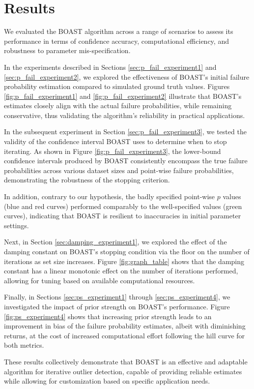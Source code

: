 \section{Results}

We evaluated the BOAST algorithm across a range of scenarios to assess its performance in terms of confidence accuracy, computational efficiency, and robustness to parameter mis-specification.

In the experiments described in Sections \ref{sec:p_fail_experiment1} and \ref{sec:p_fail_experiment2}, we explored the effectiveness of BOAST's initial failure probability estimation compared to simulated ground truth values. Figures \ref{fig:p_fail_experiment1} and \ref{fig:p_fail_experiment2} illustrate that BOAST's estimates closely align with the actual failure probabilities, while remaining conservative, thus validating the algorithm's reliability in practical applications.

In the subsequent experiment in Section \ref{sec:p_fail_experiment3}, we tested the validity of the confidence interval BOAST uses to determine when to stop iterating. As shown in Figure \ref{fig:p_fail_experiment3}, the lower-bound confidence intervals produced by BOAST consistently encompass the true failure probabilities across various dataset sizes and point-wise failure probabilities, demonstrating the robustness of the stopping criterion.

In addition, contrary to our hypothesis, the badly specified point-wise $p$ values (blue and red curves) performed comparably to the well-specified values (green curves), indicating that BOAST is resilient to inaccuracies in initial parameter settings.

Next, in Section \ref{sec:damping_experiment1}, we explored the effect of the damping constant on BOAST's stopping condition via the floor on the number of iterations as set size increases. Figure \ref{fig:graph_table} shows that the damping constant has a linear monotonic effect on the number of iterations performed, allowing for tuning based on available computational resources.

Finally, in Sections \ref{sec:ps_experiment1} through \ref{sec:ps_experiment4}, we investigated the impact of prior strength on BOAST's performance. Figure \ref{fig:ps_experiment4} shows that increasing prior strength leads to an improvement in bias of the failure probability estimates, albeit with diminishing returns, at the cost of increased computational effort following the hill curve for both metrics.

These results collectively demonstrate that BOAST is an effective and adaptable algorithm for iterative outlier detection, capable of providing reliable estimates while allowing for customization based on specific application needs.